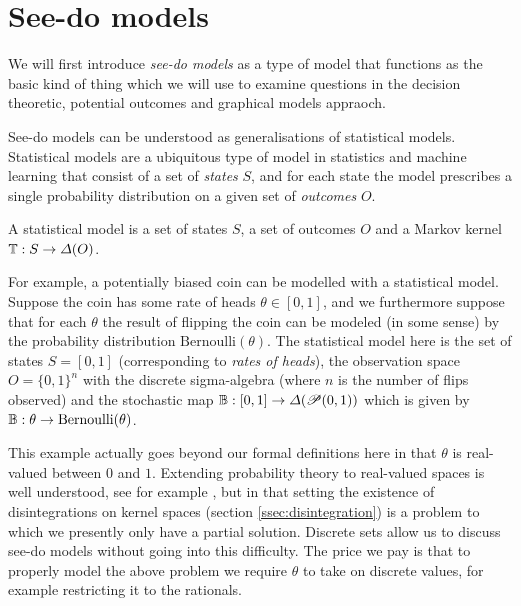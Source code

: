
\section{See-do models}\label{sec:seedo_models}

We will first introduce \emph{see-do models} as a type of model that functions as the basic kind of thing which we will use to examine questions in the decision theoretic, potential outcomes and graphical models appraoch.

See-do models can be understood as generalisations of statistical models. Statistical models are a ubiquitous type of model in statistics and machine learning that consist of a set of \emph{states} $S$, and for each state the model prescribes a single probability distribution on a given set of \emph{outcomes} $O$.

\begin{definition}\label{def:statistical model}
A statistical model is a set of states $S$, a set of outcomes $O$ and a Markov kernel $\mathbb{T}:S\to \Delta(O)$.
\end{definition}

For example, a potentially biased coin can be modelled with a statistical model. Suppose the coin has some rate of heads $\theta\in [0,1]$, and we furthermore suppose that for each $\theta$ the result of flipping the coin can be modeled (in some sense) by the probability distribution $\text{Bernoulli}(\theta)$. The statistical model here is the set of states $S=[0,1]$ (corresponding to \emph{rates of heads}), the observation space $O=\{0,1\}^n$ with the discrete sigma-algebra (where $n$ is the number of flips observed) and the stochastic map $\mathbb{B}:[0,1]\to \Delta(\mathscr{P}(0,1))$ which is given by $\mathbb{B}:\theta\to \text{Bernoulli}(\theta)$.

This example actually goes beyond our formal definitions here in that $\theta$ is real-valued between $0$ and $1$. Extending probability theory to real-valued spaces is well understood, see for example \citet{cinlar_probability_2011}, but in that setting the existence of disintegrations on kernel spaces (section \ref{ssec:disintegration}) is a problem to which we presently only have a partial solution. Discrete sets allow us to discuss see-do models without going into this difficulty. The price we pay is that to properly model the above problem we require $\theta$ to take on discrete values, for example restricting it to the rationals.

